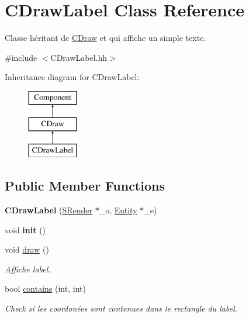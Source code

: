 \hypertarget{class_c_draw_label}{}\section{C\+Draw\+Label Class Reference}
\label{class_c_draw_label}


Classe héritant de \hyperlink{class_c_draw}{C\+Draw} et qui affiche un simple texte.  




{\ttfamily \#include $<$C\+Draw\+Label.\+hh$>$}

Inheritance diagram for C\+Draw\+Label\+:\begin{figure}[H]
\begin{center}
\leavevmode
\includegraphics[height=3.000000cm]{class_c_draw_label}
\end{center}
\end{figure}
\subsection*{Public Member Functions}
\begin{DoxyCompactItemize}
\item 
\hypertarget{class_c_draw_label_afd673dace026dfaba16a3ea64f36f026}{}{\bfseries C\+Draw\+Label} (\hyperlink{class_s_render}{S\+Render} $\ast$\+\_\+o, \hyperlink{class_entity}{Entity} $\ast$\+\_\+e)\label{class_c_draw_label_afd673dace026dfaba16a3ea64f36f026}

\item 
\hypertarget{class_c_draw_label_a154fa3e4e641a8bc67866a8d2c2bde51}{}void {\bfseries init} ()\label{class_c_draw_label_a154fa3e4e641a8bc67866a8d2c2bde51}

\item 
\hypertarget{class_c_draw_label_a458ba3fd65336695e34b344ffa787341}{}void \hyperlink{class_c_draw_label_a458ba3fd65336695e34b344ffa787341}{draw} ()\label{class_c_draw_label_a458ba3fd65336695e34b344ffa787341}

\begin{DoxyCompactList}\small\item\em Affiche label. \end{DoxyCompactList}\item 
bool \hyperlink{class_c_draw_label_ac4c633d7443a01fd21d2deef2a055133}{contains} (int, int)
\begin{DoxyCompactList}\small\item\em Check si les coordonées sont contenues dans le rectangle du label. \end{DoxyCompactList}\end{DoxyCompactItemize}
